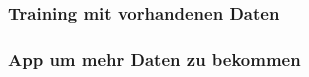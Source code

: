 \begin{frame}
    \frametitle{Training mit vorhandenen Daten}
\end{frame}

\begin{frame}
    \frametitle{App um mehr Daten zu bekommen}
\end{frame}
